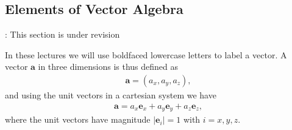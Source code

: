 \documentclass[letterpaper,10pt,english]{sphinxmanual}
\begin{document}
\subsection{Elements of Vector Algebra}
\label{\detokenize{chapter2:elements-of-vector-algebra}}
: This section is under revision

In these lectures we will use boldfaced lower\sphinxhyphen{}case letters to label a vector. A vector \(\boldsymbol{a}\) in three dimensions is thus defined as
\begin{equation*}
\begin{split}
\boldsymbol{a} =(a_x,a_y, a_z),
\end{split}
\end{equation*}
and using the unit vectors in a cartesian system we have
\begin{equation*}
\begin{split}
\boldsymbol{a} = a_x\boldsymbol{e}_x+a_y\boldsymbol{e}_y+a_z\boldsymbol{e}_z,
\end{split}
\end{equation*}
where the unit vectors have magnitude \(\vert\boldsymbol{e}_i\vert = 1\) with \(i=x,y,z\).
\end{document}
